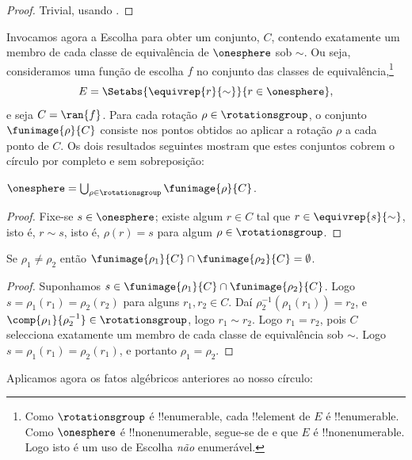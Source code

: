 \documentclass[../../../include/open-logic-section]{subfiles}
\begin{document}
\begin{proof}
Trivial, usando . 
\end{proof}

Invocamos agora a Escolha para obter um conjunto, $C$, contendo exatamente um
membro de cada classe de equivalência de $\onesphere$ sob $\sim$. Ou seja,
consideramos uma função de escolha $f$ no conjunto das classes de
equivalência,\footnote{Como $\rotationsgroup$ é !!{enumerable},
cada !!{element} de $E$ é !!{enumerable}. Como $\onesphere$ é
!!{nonenumerable}, segue-se de  e
 que $E$ é
!!{nonenumerable}. Logo isto é um uso de Escolha \emph{não} enumerável.}
\[
	E = \Setabs{\equivrep{r}{\sim}}{r \in \onesphere},
\]
e seja $C = \ran{f}$. Para cada rotação $\rho \in \rotationsgroup$,
o conjunto $\funimage{\rho}{C}$ consiste nos pontos obtidos ao
aplicar a rotação $\rho$ a cada ponto de $C$. Os dois resultados seguintes
mostram que estes conjuntos cobrem o círculo por completo e sem
sobreposição:

\begin{lem}
$\onesphere = \bigcup_{\rho \in \rotationsgroup} \funimage{\rho}{C}$.
\end{lem}

\begin{proof}
Fixe-se $s \in \onesphere$; existe algum $r \in C$ tal que $r \in
\equivrep{s}{\sim}$, isto é, $r \sim s$, isto é, $\rho(r) = s$ para algum
$\rho \in \rotationsgroup$. 
\end{proof}

\begin{lem}
Se $\rho_1 \neq \rho_2$ então $\funimage{\rho_1}{C} \cap \funimage{\rho_2}{C} = \emptyset$. 
\end{lem}

\begin{proof}
Suponhamos $s \in \funimage{\rho_{1}}{C} \cap \funimage{\rho_{2}}{C}$. Logo
$s = \rho_{1}(r_{1}) = \rho_{2}(r_{2})$ para alguns $r_{1}, r_{2} \in C$.
Daí $\rho^{-1}_2(\rho_1(r_1)) = r_{2}$, e
$\comp{\rho_1}{\rho^{-1}_2} \in \rotationsgroup$, logo $r_{1} \sim
r_{2}$. Logo $r_1 = r_2$, pois $C$ selecciona exatamente um membro de cada
classe de equivalência sob $\sim$. Logo $s = \rho_1(r_1) = \rho_2(r_1)$,
e portanto $\rho_1 = \rho_2$.
\end{proof}

Aplicamos agora os fatos algébricos anteriores ao nosso círculo:
\end{document}
